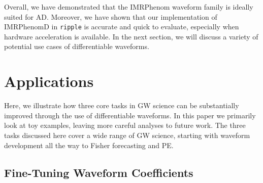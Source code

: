 \documentclass[twocolumn]{aastex631}
\newcommand{\ripple}{\texttt{ripple}\xspace}
\newcommand{\te}[1]{\textbf{\color{pyGreen}(TE: #1)}}
\begin{document}
Overall, we have demonstrated that the IMRPhenom waveform family is ideally suited for AD.
Moreover, we have shown that our implementation of IMRPhenomD in \ripple is accurate and quick to evaluate, especially when hardware acceleration is available.
In the next section, we will discuss a variety of potential use cases of differentiable waveforms.


\section{Applications}
\label{sec:applications}

Here, we illustrate how three core tasks in GW science can be substantially improved through the use of differentiable waveforms.
In this paper we primarily look at toy examples, leaving more careful analyses to future work. 
The three tasks discussed here cover a wide range of GW science, starting with waveform development all the way to Fisher forecasting and PE.

\subsection{Fine-Tuning Waveform Coefficients}
\label{subsec:coeffs}

\end{document}
